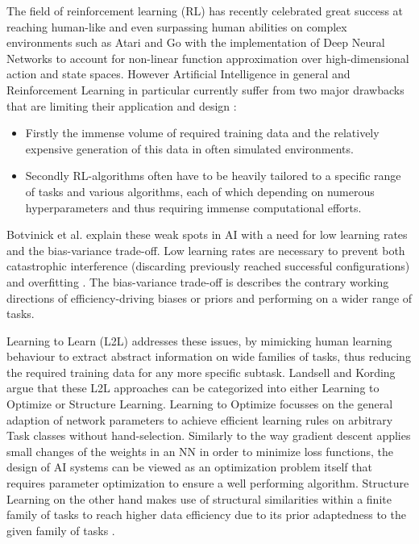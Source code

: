 \documentclass[letterpaper, 10 pt, conference]{ieeeconf}  %
\begin{document}
The field of reinforcement learning (RL) has recently celebrated great success at reaching human-like and even surpassing human abilities on
complex environments such as Atari \cite{mnihAsynchronousMethodsDeep2016} and Go \cite{silverMasteringGameGo2016} with the implementation 
of Deep Neural Networks to 
account for non-linear function approximation over high-dimensional action and state spaces. However Artificial Intelligence in general 
\cite{lansdellLearningtolearn2018} and Reinforcement Learning in particular \cite{duanRLFastReinforcement2016} currently
suffer from two major drawbacks 
that are limiting their application and design \cite{wangLearningReinforcementLearn2016}:
\begin{itemize}
        \item Firstly the immense volume of required training data and the relatively expensive generation of this data in often simulated
        environments.
        \item Secondly RL-algorithms often have to be heavily tailored to a specific range of tasks and various algorithms, each of which
        depending on numerous hyperparameters and thus requiring immense computational efforts.
\end{itemize}        

Botvinick et al. \cite{botvinickReinforcementLearningFast2019} explain these weak spots in AI with a need for low 
learning rates and the bias-variance trade-off.
Low learning rates are necessary to prevent both catastrophic interference (discarding previously reached successful
configurations) and overfitting \cite{hardtTrainFasterGeneralize2015}. The bias-variance trade-off is describes the contrary 
working directions of efficiency-driving biases or priors and performing on a wider range of tasks. \newline

Learning to Learn (L2L) addresses these issues, by mimicking human learning behaviour to extract abstract information on wide
families of tasks, thus reducing the required training data for any more specific subtask. Landsell and
Kording\cite{lansdellLearningtolearn2018} argue
that these L2L approaches can be categorized into 
either Learning to Optimize or Structure Learning. Learning to Optimize focusses on the general 
adaption of network parameters to achieve efficient learning rules on arbitrary Task classes without hand-selection. Similarly to the way
gradient descent applies small changes of the weights in an NN in order to minimize loss functions, the design of AI systems can be viewed as
an optimization problem itself that requires parameter optimization to ensure a well performing algorithm. Structure Learning 
on the other hand makes use of structural similarities within a finite family of tasks to reach higher data
efficiency due to its prior adaptedness to the given family of tasks \cite{lansdellLearningtolearn2018}. \newline
\end{document}
